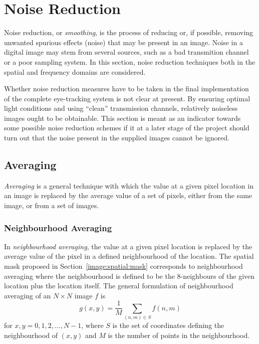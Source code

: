 
\section{Noise Reduction}
\label{image:noise}

Noise reduction, or {\em smoothing\/}, is the process of reducing or,
if possible, removing unwanted spurious effects (noise) that may be
present in an image.  Noise in a digital image may stem from several
sources, such as a bad transmition channel or a poor sampling system.
In this section, noise reduction techniques both in the spatial and
frequency domains are considered.

Whether noise reduction measures have to be taken in the final
implementation of the complete eye-tracking system is not clear at
present.  By ensuring optimal light conditions and using ``clean''
transmission channels, relatively noiseless images ought to be
obtainable.  This section is meant as an indicator towards some
possible noise reduction schemes if it at a later stage of the project
should turn out that the noise present in the supplied images cannot
be ignored.

\subsection{Averaging}
\label{image:noise:averaging}

{\em Averaging\/} is a general technique with which the value at a
given pixel location in an image is replaced by the average value of a
set of pixels, either from the same image, or from a set of images.

\subsubsection{Neighbourhood Averaging}

In {\em neighbourhood averaging\/}, the value at a given pixel
location is replaced by the average value of the pixel in a defined
neighbourhood of the location.  The spatial mask proposed in
Section~\ref{image:spatial:mask} corresponds to neighbourhood
averaging where the neighbourhood is defined to be the 8-neighbours of
the given location plus the location itself.  The general formulation
of neighbourhood averaging of an $N\times N$ image $f$ is
\begin{equation}
\label{eq:averaging:neighbourhood}
  g(x,y)=\frac{1}{M}\sum_{(n,m)\in S}f(n,m)
\end{equation}
for $x,y=0,1,2,\ldots,N-1$, where $S$ is the set of coordinates
defining the neighbourhood of $(x,y)$ and $M$ is the number of points
in the neighbourhood.

